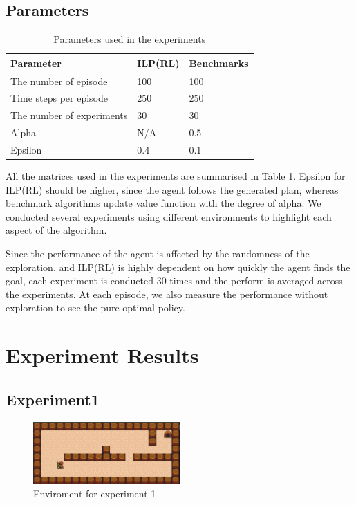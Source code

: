 \subsection{Parameters}
\begin{table}[!ht!b]
\centering
\begin{tabular}{lll}
\hline
Parameter            & ILP(RL)    & Benchmarks      \\ \hline
The number of episode& 100        & 100        \\
Time steps per episode& 250        & 250        \\
The number of experiments& 30       & 30       \\
Alpha                & N/A       & 0.5       \\
Epsilon              & 0.4        & 0.1        \\
\end{tabular}
\caption{Parameters used in the experiments}
\label{param}
\end{table}

All the matrices used in the experiments are summarised in Table \ref{param}.
Epsilon for ILP(RL) should be higher, since the agent follows the generated plan,
whereas benchmark algorithms update value function with the degree of alpha.
We conducted several experiments using different environments to highlight each aspect of the algorithm.

Since the performance of the agent is affected by the randomness of the exploration,
and ILP(RL) is highly dependent on how quickly the agent finds the goal,
each experiment is conducted 30 times and the perform is averaged across the experiments.
At each episode, we also measure the performance without exploration to see the pure optimal policy.

\section{Experiment Results}
\label{learning_evaluation}

\subsection{Experiment1}
\begin{figure}[!htb]
\centering
\includegraphics[width=0.5\textwidth]{./figures/experiment1}
\caption{Enviroment for experiment 1}
\label{experiment1}
\end{figure}

